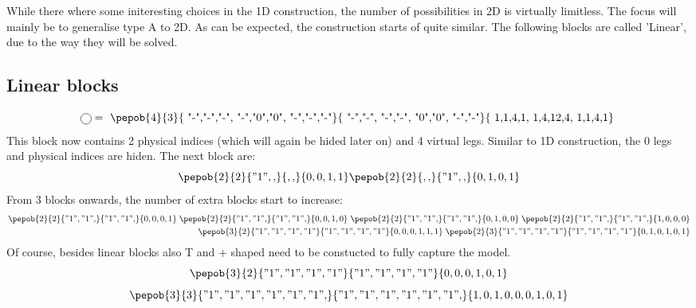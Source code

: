 While there where some initeresting choices in the 1D construction, the number of possibilities in 2D is virtually limitless. The focus will mainly be to generalise type A to 2D. As can be expected, the construction starts of quite similar. The following blocks are called 'Linear', due to the way they will be solved.

\subsection{Linear blocks}

\begin{equation}
    \mpob{1}{ {,}  }{}{}{}{{,,}} = \vcenter{ \hbox{ \pepob{4}{3}{{
                        "-","-","-",
                        "-","0","0",
                        "-","-","-"}}{{
                        "-","-",
                        "-","-",
                        "0","0",
                        "-","-"}}{{
                        1,1,4,1,
                        1,4,12,4,
                        1,1,4,1}} }}
\end{equation}
This block now contains 2 physical indices (which will again be hided later on) and 4 virtual legs. Similar to 1D construction, the 0 legs and physical indices are hiden. The next block are:
\begin{equation}\label{2dblocksorder2}
    \pepob{2}{2}{{"1",,}}{{,,}}{{0,0,1,1}}  \pepob{2}{2}{{,,}}{{"1",,}}{{0,1,0,1}}
\end{equation}
From 3 blocks onwards, the number of extra blocks start to increase:
\begin{equation}
    \begin{split}
        \pepob{2}{2}{{"1","1",}}{{"1","1",}}{{0,0,0,1}} \;  \pepob{2}{2}{{"1","1",}}{{"1","1",}}{{0,0,1,0}} \; \pepob{2}{2}{{"1","1",}}{{"1","1",}}{{0,1,0,0}} \; \pepob{2}{2}{{"1","1",}}{{"1","1",}}{{1,0,0,0}}\\
        \pepob{3}{2}{{"1","1","1","1"}}{{"1","1","1","1"}}{{0,0,0,1,1,1}} \; \pepob{2}{3}{{"1","1","1","1"}}{{"1","1","1","1"}}{{0,1,0,1,0,1}}
    \end{split}
\end{equation}
Of course, besides linear blocks also T and + shaped need to be constucted to fully capture the model.
\begin{equation}
    \pepob{3}{2}{{"1","1","1","1"}}{{"1","1","1","1"}}{{0,0,0,1,0,1}}
\end{equation}
\begin{equation}
    \pepob{3}{3}{{"1","1","1","1","1","1",}}{{"1","1","1","1","1","1",}}{{1,0,1,0,0,0,1,0,1}}
\end{equation}
